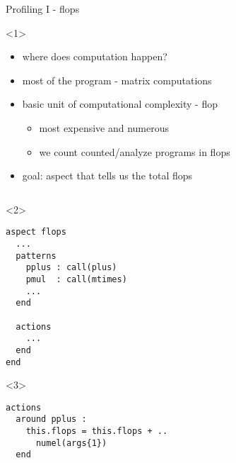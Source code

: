 \begin{frame}[fragile]{Profiling I - flops}
  \begin{onlyenv}<1>
    \begin{itemize}
     \item where does computation happen?
    \item most of the program - matrix computations
    \item basic unit of computational complexity - flop
      \begin{itemize}
      \item most expensive and numerous
      \item we count counted/analyze programs in flops
      \end{itemize}
    \item goal: aspect that tells us the total flops
    \end{itemize}
  \end{onlyenv}
    \begin{columns}
      \begin{column}{5cm}
        \begin{onlyenv}<2>
          \begin{Verbatim}[commandchars=@\[\]]
aspect flops
  ...
  patterns
    pplus : call(plus)
    pmul  : call(mtimes)
    ...
  end

  actions
    ...
  end
end
        \end{Verbatim}
      \end{onlyenv}
        \begin{onlyenv}<3>
          \begin{Verbatim}[commandchars=@\[\]]
actions
  around pplus : 
    this.flops = this.flops + ..
      numel(args{1})
  end
        

\end{Verbatim}
\end{onlyenv}
\end{column}
\end{columns}
\end{frame}
